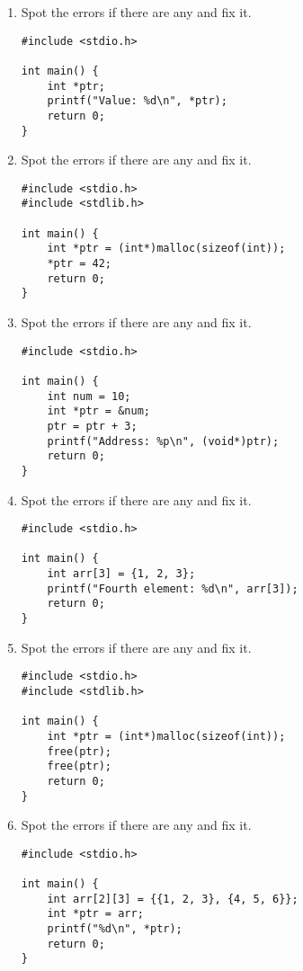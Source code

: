\documentclass[a4paper,12pt]{article}
\begin{document}
\begin{enumerate}
    \item Spot the errors if there are any and fix it.
\begin{lstlisting}
#include <stdio.h>

int main() {
    int *ptr; 
    printf("Value: %d\n", *ptr); 
    return 0;
}\end{lstlisting}

    \item Spot the errors if there are any and fix it.
\begin{lstlisting}
#include <stdio.h>
#include <stdlib.h>

int main() {
    int *ptr = (int*)malloc(sizeof(int));
    *ptr = 42;
    return 0; 
}\end{lstlisting}

    \item Spot the errors if there are any and fix it.
\begin{lstlisting}
#include <stdio.h>

int main() {
    int num = 10;
    int *ptr = &num;
    ptr = ptr + 3; 
    printf("Address: %p\n", (void*)ptr);
    return 0;
}\end{lstlisting}

    \item Spot the errors if there are any and fix it.

\begin{lstlisting}
#include <stdio.h>

int main() {
    int arr[3] = {1, 2, 3};
    printf("Fourth element: %d\n", arr[3]);
    return 0;
}\end{lstlisting}

    \item Spot the errors if there are any and fix it.

\begin{lstlisting}
#include <stdio.h>
#include <stdlib.h>

int main() {
    int *ptr = (int*)malloc(sizeof(int));
    free(ptr);
    free(ptr); 
    return 0;
}\end{lstlisting}

\newpage

    \item Spot the errors if there are any and fix it.

\begin{lstlisting}
#include <stdio.h>

int main() {
    int arr[2][3] = {{1, 2, 3}, {4, 5, 6}};
    int *ptr = arr; 
    printf("%d\n", *ptr);
    return 0;
}\end{lstlisting}


\end{enumerate}
\end{document}
